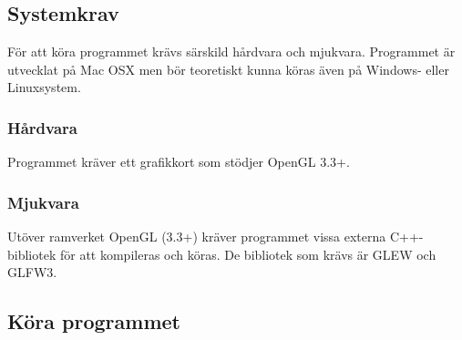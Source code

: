 \documentclass[a4paper,12pt,oneside,final,swedish]{extarticle}
\begin{document}
\subsection{Systemkrav}
För att köra programmet krävs särskild hårdvara och mjukvara. Programmet är utvecklat på Mac OSX men bör teoretiskt kunna köras även på Windows- eller Linuxsystem.
\subsubsection{Hårdvara}
Programmet kräver ett grafikkort som stödjer OpenGL 3.3+.
\subsubsection{Mjukvara}
Utöver ramverket OpenGL (3.3+) kräver programmet vissa externa C++-bibliotek för att kompileras och köras. De bibliotek som krävs är GLEW och GLFW3.
\subsection{Köra programmet}
\end{document}
